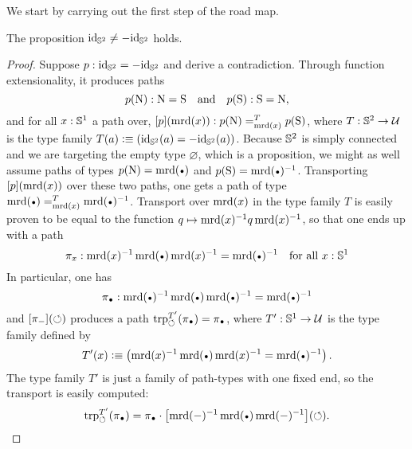 \documentclass[english,a4paper]{lmcs}
\begin{document}
We start by carrying out the first step of the road map.

\begin{lem}
  \label{lemma:S2-id-neq-minusid}%
  The proposition $\mathord{\mathrm{id}}_{{\mathbb S^{2}}} \neq -\mathord{\mathrm{id}}_{{\mathbb S^{2}}}$ holds.
\end{lem}
\begin{proof}
  Suppose $p:\mathord{\mathrm{id}}_{{\mathbb S^{2}}} = -\mathord{\mathrm{id}}_{{\mathbb S^{2}}}$ and derive a contradiction. Through
  function extensionality, it produces paths
  \begin{displaymath}
    p(\mathrm{N}) : \mathrm{N} = \mathrm{S}
    \quad\text{and}\quad
    p(\mathrm{S}) : \mathrm{S} = \mathrm{N},
  \end{displaymath}
  and for all $x:{{\mathbb S^{1}}}$ a path over,
  $\mathop{\left[{p}\right]} (\operatorname{\mathrm{mrd}}(x)): p(\mathrm{N}) =^{T}_{\operatorname{\mathrm{mrd}}(x)} p(\mathrm{S})$, where
  $T: {{\mathbb S^{2}}} \to \mathcal{U}$ is the type family
  $T(a)\vcentcolon\equiv (\mathord{\mathrm{id}}_{{\mathbb S^{2}}}(a) = -\mathord{\mathrm{id}}_{{\mathbb S^{2}}}(a))$. Because ${{\mathbb S^{2}}}$ is simply
  connected and we are targeting the empty type $\varnothing$, which
  is a proposition, we might as well assume paths of types $p(\north)=\mrd(\base)$
  and $p(\south) = \inv{\mrd(\base)}$. Transporting $\mathop{\left[{p}\right]}(\operatorname{\mathrm{mrd}}(x))$ over
  these two paths, one gets a path of type
  $\pathover {\mrd(\base)} T {\mrd(x)} {\inv{\mrd(\base)}}$.
  Transport over $\operatorname{\mathrm{mrd}}(x)$ in the type family $T$ is
  easily proven to be equal to the function
  $q \mapsto \operatorname{\mathrm{mrd}}(x)^{-1} q \operatorname{\mathrm{mrd}}(x)^{-1}$, so that one
  ends up with a path
  \begin{displaymath}
    \pi_x\from \inv{\mrd(x)} \mrd(\base) \inv{\mrd(x)} = \inv{\mrd(\base)}
    \quad
    \text{for all }x\from\Sc
  \end{displaymath}
  In particular, one has
  \begin{displaymath}
    \pi_{\base} \from \inv{\mrd(\base)} \mrd(\base) \inv{\mrd(\base)}
    = \inv{\mrd(\base)}
  \end{displaymath}
  and $\mathop{\left[{\pi_{\mathord{{-}}}}\right]} (\mathord{\circlearrowleft})$ produces a path
  $\trp [T'] \Sloop (\pi_{\base}) = \pi_{\base}$, where $T':{{\mathbb S^{1}}}\to\mathcal{U}$
  is the type family defined by
  \begin{displaymath}
    T'(x) \defequi \left(\inv{\mrd(x)}\mrd(\base)\inv{\mrd(x)}
      = \inv{\mrd(\base)} \right).
  \end{displaymath}
  The type family $T'$ is just a family of path-types with one fixed
  end, so the transport is easily computed:
  \begin{displaymath}
    \trp [T'] \Sloop (\pi_{\base}) = \pi_{\base} \cdot
    \ap{\inv{\mrd(\blank)} \mrd(\base) \inv{\mrd(\blank)}}(\Sloop).
  \end{displaymath}

\end{proof}
\end{document}
